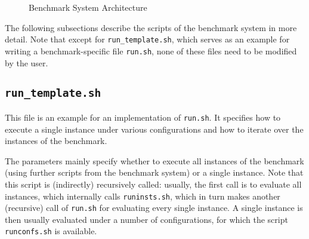 \documentclass[a4paper]{article}
\begin{document}
\begin{figure}
		\endpgfgraphicnamed
			
		\caption{Benchmark System Architecture}
		\label{fig:architecture}
		\end{figure}

		The following subsections describe the scripts of the benchmark system
		in more detail.
		Note that except for {\tt run\_template.sh}, which serves as an example
		for writing a benchmark-specific file {\tt run.sh}, none of these files need
		to be modified by the user.

		\subsection{\tt run\_template.sh}
		\label{sec:architecture:run}
		
			This file is an example for an implementation of {\tt run.sh}.
		    It specifies how to execute a single instance under various configurations
		    and how to iterate over the instances of the benchmark.
		    
		    The parameters mainly specify whether to execute all instances
		    of the benchmark (using further scripts from the benchmark system)
		    or a single instance.
		    Note that this script is (indirectly) recursively called:
		    usually, the first call is to evaluate all instances, which internally
		    calls {\tt runinsts.sh}, which in turn makes another (recursive) call of {\tt run.sh}
		    for evaluating every single instance.
		    A single instance is then usually evaluated under a number of configurations,
		    for which the script {\tt runconfs.sh} is available.
\end{document}
